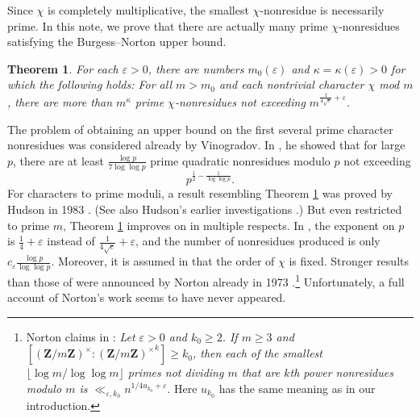\documentclass{scrartcl}
\theoremstyle{plain}
\newtheorem{thm}{Theorem}[section]
\theoremstyle{remark}
\newcommand{\1}{\mathbf{1}}
\newcommand{\Z}{\mathbf{Z}}
\begin{document}
Since $\chi$ is completely multiplicative, the smallest $\chi$-nonresidue is necessarily prime. In this note, we prove that there are actually many prime $\chi$-nonresidues satisfying the Burgess--Norton upper bound.

\begin{thm}\label{thm:main} For each $\varepsilon > 0$, there are numbers $m_0(\varepsilon)$ and $\kappa=\kappa(\varepsilon)> 0$ for which the following holds: For all $m > m_0$ and each nontrivial character $\chi$ mod $m$, there are more than $m^{\kappa}$ prime $\chi$-nonresidues not exceeding $m^{\frac{1}{4\sqrt{e}}+\varepsilon}$.
\end{thm}

The problem of obtaining an upper bound on the first several prime character nonresidues was considered already by Vinogradov. In \cite{vinogradov18},  he showed that for large $p$, there are at least $\frac{\log{p}}{7\log\log{p}}$ prime quadratic nonresidues modulo $p$ not exceeding \[ p^{\frac{1}{2}-\frac{1}{\log\log{p}}}. \]
For characters to prime moduli, a result resembling Theorem \ref{thm:main} was proved by Hudson in 1983 \cite{hudson83}. (See also Hudson's earlier investigations \cite{hudson73,hudson74,hudson74A}.) But even restricted to prime $m$, Theorem \ref{thm:main} improves on \cite{hudson83} in multiple respects. In \cite{hudson83}, the exponent on $p$ is $\frac{1}{4}+\varepsilon$ instead of $\frac{1}{4\sqrt{e}} +\varepsilon$, and the number of nonresidues produced is only $c_{\varepsilon} \frac{\log{p}}{\log\log{p}}$. Moreover, it is assumed in \cite{hudson83} that the order of $\chi$ is fixed. Stronger results than those of \cite{hudson83} were  announced by Norton already in 1973 \cite{norton74}.\footnote{Norton claims in \cite{norton74}: \emph{Let $\varepsilon>0$ and $k_0 \ge 2$. If $m \ge 3$ and $[(\Z/m\Z)^{\times}: {(\Z/m\Z)^{\times}}^k] \ge k_0$, then each of the smallest $\lfloor \log{m}/\log\log{m}\rfloor$ primes not dividing $m$ that are $k$th power nonresidues modulo $m$ is $\ll_{\varepsilon,k_0}n^{1/4u_{k_0} + \varepsilon}$}. Here $u_{k_0}$ has the same meaning as in our introduction.}  Unfortunately, a full account of Norton's work seems to have never appeared.
\end{document}
